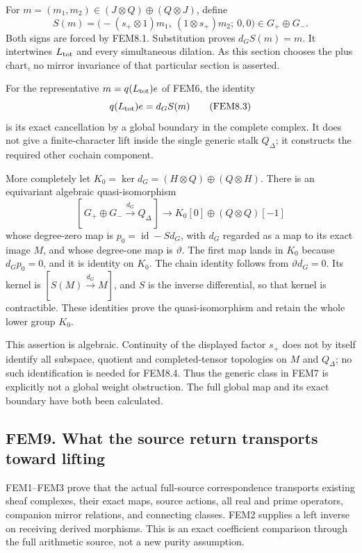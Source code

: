 For \(m=(m_1,m_2)\in(J\otimes Q)\oplus(Q\otimes J)\), define \[
S(m)=
\bigl(- (s_+\otimes1)m_1,\ (1\otimes s_+)m_2;\ 0,0\bigr)
\in G_+\oplus G_- .
\tag{FEM8.2}
\] Both signs are forced by FEM8.1. Substitution proves \(d_GS(m)=m\).
It intertwines \(L_{\rm tot}\) and every simultaneous dilation. As this
section chooses the plus chart, no mirror invariance of that particular
section is asserted.

For the representative \(m=q(L_{\rm tot})e\) of FEM6, the identity \[
q(L_{\rm tot})e=d_GS(m)
\tag{FEM8.3}
\] is its exact cancellation by a global boundary in the complete
complex. It does not give a finite-character lift inside the single
generic stalk \(Q_\Delta\); it constructs the required other cochain
component.

More completely let \(K_0=\ker d_G=(H\otimes Q)\oplus(Q\otimes H)\).
There is an equivariant algebraic quasi-isomorphism \[
[\,G_+\oplus G_-\xrightarrow{d_G}Q_\Delta\,]
 \longrightarrow K_0[0]\oplus(Q\otimes Q)[-1]
\tag{FEM8.4}
\] whose degree-zero map is \(p_0=\operatorname{id}-Sd_G\), with \(d_G\)
regarded as a map to its exact image \(M\), and whose degree-one map is
\(\vartheta\). The first map lands in \(K_0\) because \(d_Gp_0=0\), and
it is identity on \(K_0\). The chain identity follows from
\(\vartheta d_G=0\). Its kernel is \([S(M)\xrightarrow{d_G}M]\), and
\(S\) is the inverse differential, so that kernel is contractible. These
identities prove the quasi-isomorphism and retain the whole lower group
\(K_0\).

This assertion is algebraic. Continuity of the displayed factor \(s_+\)
does not by itself identify all subspace, quotient and completed-tensor
topologies on \(M\) and \(Q_\Delta\); no such identification is needed
for FEM8.4. Thus the generic class in FEM7 is explicitly not a global
weight obstruction. The full global map and its exact boundary have both
been calculated.

\subsection{FEM9. What the source return transports toward
lifting}\label{fem9.-what-the-source-return-transports-toward-lifting}

FEM1--FEM3 prove that the actual full-source correspondence transports
existing sheaf complexes, their exact maps, source actions, all real and
prime operators, companion mirror relations, and connecting classes.
FEM2 supplies a left inverse on receiving derived morphisms. This is an
exact coefficient comparison through the full arithmetic source, not a
new purity assumption.


